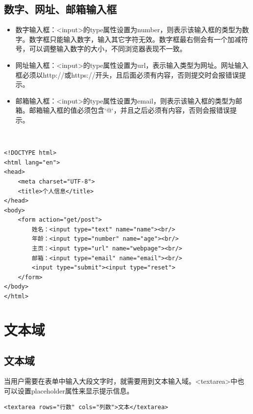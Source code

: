 \subsection{数字、网址、邮箱输入框}

\begin{itemize}
	\item 数字输入框：<input>的type属性设置为number，则表示该输入框的类型为数字。数字框只能输入数字，输入其它字符无效。数字框最右侧会有一个加减符号，可以调整输入数字的大小，不同浏览器表现不一致。

	\item 网址输入框：<input>的type属性设置为url，表示输入类型为网址。网址输入框必须以http://或https://开头，且后面必须有内容，否则提交时会报错误提示。

	\item 邮箱输入框：<input>的type属性设置为email，则表示该输入框的类型为邮箱。邮箱输入框的值必须包含`@`，并且之后必须有内容，否则会报错误提示。
\end{itemize}

\vspace{0.5cm}

\\

\begin{lstlisting}[style=htmlcssjs]
<!DOCTYPE html>
<html lang="en">
<head>
    <meta charset="UTF-8">
    <title>个人信息</title>
</head>
<body>
    <form action="get/post">
        姓名：<input type="text" name="name"><br/>
        年龄：<input type="number" name="age"><br/>
        主页：<input type="url" name="webpage"><br/>
        邮箱：<input type="email" name="email"><br/>
        <input type="submit"><input type="reset">
    </form>
</body>
</html>
\end{lstlisting}

\newpage

\section{文本域}

\subsection{文本域}

当用户需要在表单中输入大段文字时，就需要用到文本输入域。<textarea>中也可以设置placeholder属性来显示提示信息。\\

\begin{lstlisting}[style=htmlcssjs]
<textarea rows="行数" cols="列数">文本</textarea>
\end{lstlisting}

